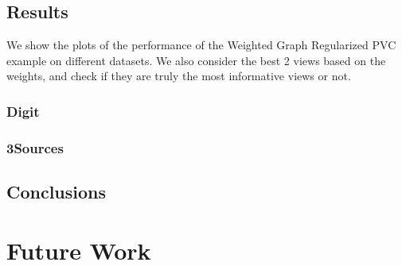\documentclass[a4paper]{article}
\begin{document}
	\subsection{Results}

	We show the plots of the performance of the Weighted Graph Regularized PVC example on different datasets. We also consider the best 2 views based on the weights, and check if they are truly the most informative views or not.	
	
	\subsubsection{Digit}
	\subsubsection{3Sources}
	\subsection{Conclusions}
	
	\section{Future Work}	
	
\end{document}
